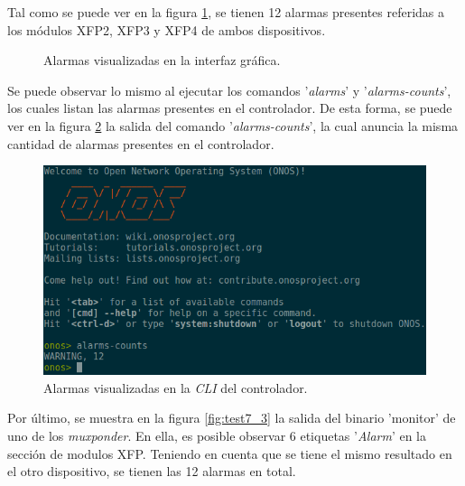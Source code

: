   Tal como se puede ver en la figura \ref{fig:test7_1}, se tienen 12 alarmas presentes referidas a los módulos XFP2, XFP3 y XFP4 de ambos dispositivos.

  \begin{figure}[H]
	\centering
	\caption{Alarmas visualizadas en la interfaz gráfica.}
	\label{fig:test7_1}
  \end{figure}

  Se puede observar lo mismo al ejecutar los comandos '\textit{alarms}' y '\textit{alarms-counts}', los cuales listan las alarmas presentes en el controlador. De esta forma, se puede ver en la figura \ref{fig:test7_2} la salida del comando '\textit{alarms-counts}', la cual anuncia la misma cantidad de alarmas presentes en el controlador.

  \begin{figure}[H]
	\centering
	\includegraphics[scale=0.5]{Figures/test7_2.png}
	\caption{Alarmas visualizadas en la \textit{CLI} del controlador.}
	\label{fig:test7_2}
  \end{figure}

  Por último, se muestra en la figura \ref{fig:test7_3} la salida del binario 'monitor' de uno de los \textit{muxponder}. En ella, es posible observar 6 etiquetas '\textit{Alarm}' en la sección de modulos XFP. Teniendo en cuenta que se tiene el mismo resultado en el otro dispositivo, se tienen las 12 alarmas en total.

